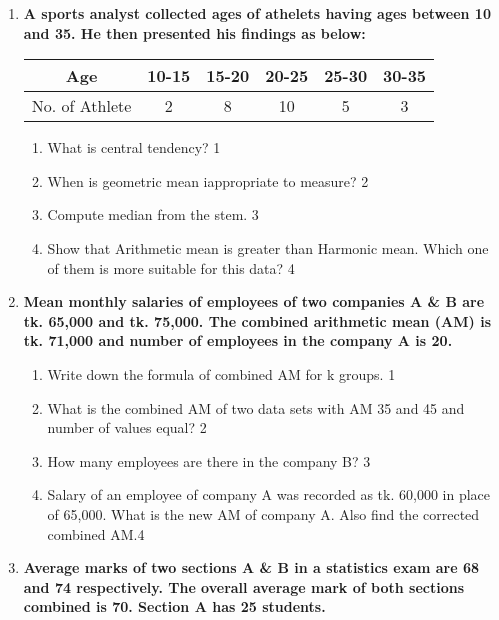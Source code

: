 \documentclass[a4paper,oneside]{book}
\begin{document}
\begin{enumerate}
  
     \item
	  \textbf{A sports analyst collected ages of athelets having ages between 10 and 35. He then presented his findings as below:} 
	  
	  \begin{table}[h]
	    \centering
\begin{tabular}{c|c|c|c|c|c}
Age            & 10-15 & 15-20 & 20-25 & 25-30 & 30-35 \\ \hline
No. of Athlete & 2     & 8     & 10    & 5     & 3    
\end{tabular}
\end{table}
  
  \begin{enumerate}
    \item
	What is central tendency? \hfill 1
    \item
	When is geometric mean iappropriate to measure? \hfill 2
    \item  
	Compute median from the stem. \hfill 3
    \item
	Show that Arithmetic mean is greater than Harmonic mean. Which one of them is more suitable for this data? \hfill 4
  \end{enumerate}

   \item
	  \textbf{Mean monthly salaries of employees of two companies A \& B are tk. 
	  65,000 and tk. 75,000. The combined arithmetic mean (AM) is tk. 
	  71,000 and number of employees in the company A is 20.} 
	  
  \begin{enumerate}
    \item
	Write down the formula of combined AM for k groups. \hfill 1
    \item
	What is the combined AM of two data sets with AM 35 and 45 and number of values equal? \hfill 2
    \item  
	How many employees are there in the company B? \hfill 3
    \item
	Salary of an employee of company A was recorded as tk. 60,000 in place of
	65,000. What is the new AM of company A. Also find the corrected combined AM.\hfill 4
  \end{enumerate}
  
  \item
\textbf{Average marks of two sections A \& B in a statistics exam are 68 and 74 respectively. The overall average mark of both sections combined is 70. Section A has 25 students.}


\end{enumerate}
\end{document}
